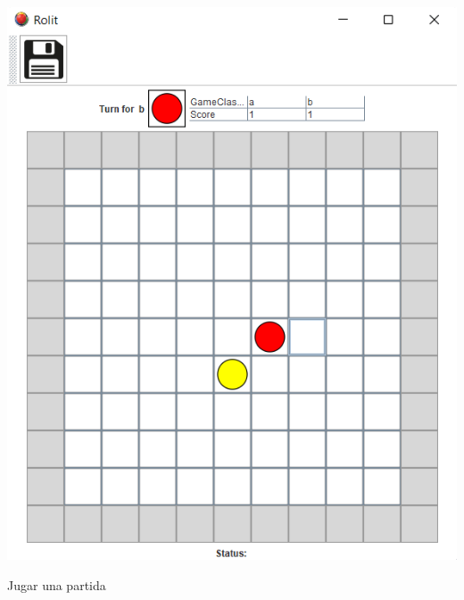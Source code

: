 \documentclass[../DocumentoOficial.tex]{subfiles}
\begin{document}
\begin{sprint}[6]
\begin{center}
\end{center}

\begin{center}
\includegraphics[scale=1]{partida-sprint-6.png}

Jugar una partida
\end{center}


\end{sprint}
\end{document}
